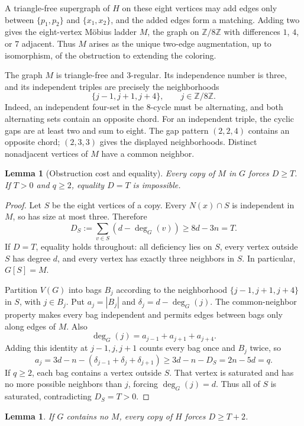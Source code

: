 \documentclass[11pt]{article}
\newtheorem{lemma}[theorem]{Lemma}
\theoremstyle{definition}
\theoremstyle{remark}
\newcommand{\N}{N}
\newcommand{\Z}{\mathbb Z}
\begin{document}
A triangle-free supergraph of $H$ on these eight vertices may add edges only
between $\{p_1,p_2\}$ and $\{x_1,x_2\}$, and the added edges form a matching.
Adding two gives the eight-vertex M\"obius ladder $M$, the graph on
$\Z/8\Z$ with differences $1$, $4$, or $7$ adjacent. Thus $M$ arises as the
unique two-edge augmentation, up to isomorphism, of the obstruction to
extending the coloring.

The graph $M$ is triangle-free and $3$-regular. Its independence number is
three, and its independent triples are precisely the neighborhoods
\[
  \{j-1,j+1,j+4\},\qquad j\in\Z/8\Z.
\]
Indeed, an independent four-set in the $8$-cycle must be alternating, and
both alternating sets contain an opposite chord. For an independent triple,
the cyclic gaps are at least two and sum to eight. The gap pattern $(2,2,4)$
contains an opposite chord; $(2,3,3)$ gives the displayed neighborhoods.
Distinct nonadjacent vertices of $M$ have a common neighbor.

\begin{lemma}[Obstruction cost and equality]\label{lem:no-mobius}
Every copy of $M$ in $G$ forces $D\ge T$. If $T>0$ and $q\ge2$, equality
$D=T$ is impossible.
\end{lemma}

\begin{proof}
Let $S$ be the eight vertices of a copy. Every $\N(x)\cap S$ is independent
in $M$, so has size at most three. Therefore
\[
  D_S:=\sum_{v\in S}(d-\deg_G(v))\ge8d-3n=T.
\]
If $D=T$, equality holds throughout: all deficiency lies on $S$, every
vertex outside $S$ has degree $d$, and every vertex has exactly three
neighbors in $S$. In particular, $G[S]=M$.

Partition $V(G)$ into bags $B_j$ according to the neighborhood
$\{j-1,j+1,j+4\}$ in $S$, with $j\in B_j$. Put $a_j=|B_j|$ and
$\delta_j=d-\deg_G(j)$. The common-neighbor property makes every bag
independent and permits edges between bags only along edges of $M$. Also
\[
  \deg_G(j)=a_{j-1}+a_{j+1}+a_{j+4}.
\]
Adding this identity at $j-1,j,j+1$ counts every bag once and $B_j$ twice,
so
\[
  a_j=3d-n-(\delta_{j-1}+\delta_j+\delta_{j+1})
  \ge3d-n-D_S=2n-5d=q.
\]
If $q\ge2$, each bag contains a vertex outside $S$. That vertex is saturated
and has no more possible neighbors than $j$, forcing $\deg_G(j)=d$.
Thus all of $S$ is saturated, contradicting $D_S=T>0$.
\end{proof}

\begin{lemma}\label{lem:no-H}
If $G$ contains no $M$, every copy of $H$ forces $D\ge T+2$.
\end{lemma}
\end{document}
